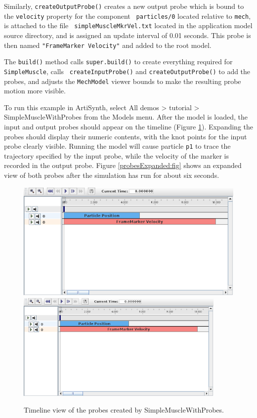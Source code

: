 Similarly, {\tt createOutputProbe()} creates a new output probe which
is bound to the {\tt velocity} property for the component {\tt
particles/0} located relative to {\tt mech}, is attached to the file {\tt
simpleMuscleMkrVel.txt} located in the application model source
directory, and is assigned an update interval of 0.01 seconds. This probe is
then named {\tt "FrameMarker Velocity"} and added to the root model.

The {\tt build()} method calls {\tt super.build()} to create
everything required for {\tt SimpleMuscle}, calls {\tt
createInputProbe()} and {\tt createOutputProbe()} to add the probes,
and adjusts the {\tt MechModel} viewer bounds to make the resulting
probe motion more visible.

To run this example in ArtiSynth, select {\sf All demos > tutorial >
SimpleMuscleWithProbes} from the {\sf Models} menu. After the model is
loaded, the input and output probes should appear on the timeline
(Figure \ref{probes:fig}). Expanding the probes should display their
numeric contents, with the knot points for the input probe clearly
visible.  Running the model will cause particle {\tt p1} to trace the
trajectory specified by the input probe, while the velocity of the
marker is recorded in the output probe. Figure
\ref{probesExpanded:fig} shows an expanded view of both probes after
the simulation has run for about six seconds.


\begin{figure}[ht]
\begin{center}
\iflatexml
 \includegraphics[]{images/timelineProbes}
\else
 \includegraphics[width=4in]{images/timelineProbes}
\fi
\end{center}
\caption{Timeline view of the probes created by SimpleMuscleWithProbes.}
\label{probes:fig}
\end{figure}

